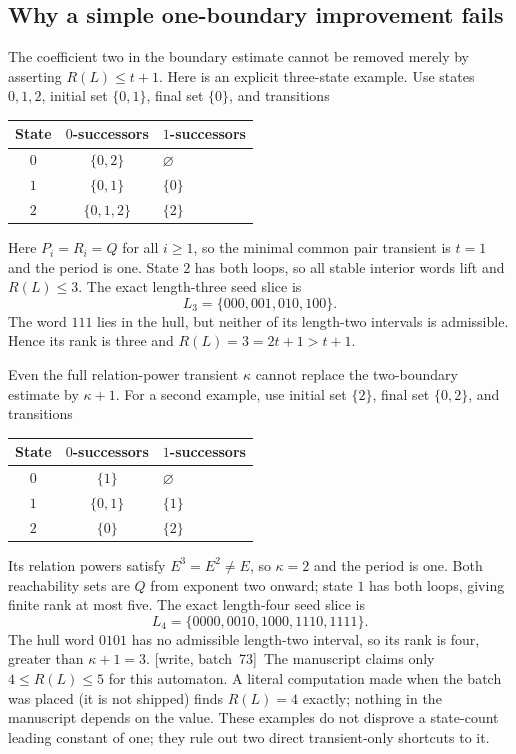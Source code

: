 \documentclass[11pt,letterpaper]{article}
\theoremstyle{definition}
\theoremstyle{remark}
\newcommand{\wsevthree}{\textup{[write, batch~73]}}
\begin{document}
\subsection{Why a simple one-boundary improvement fails}
The coefficient two in the boundary estimate cannot be removed merely by asserting $R(L)\le t+1$. Here is an explicit three-state example. Use states $0,1,2$, initial set $\{0,1\}$, final set $\{0\}$, and transitions
\begin{center}
\begin{tabular}{ccl}
\toprule
State & $0$-successors & $1$-successors\\
\midrule
$0$ & $\{0,2\}$ & $\varnothing$\\
$1$ & $\{0,1\}$ & $\{0\}$\\
$2$ & $\{0,1,2\}$ & $\{2\}$\\
\bottomrule
\end{tabular}
\end{center}
Here $P_i=R_i=Q$ for all $i\ge1$, so the minimal common pair transient is $t=1$ and the period is one. State $2$ has both loops, so all stable interior words lift and $R(L)\le3$. The exact length-three seed slice is
\[
L_3=\{000,001,010,100\}.
\]
The word $111$ lies in the hull, but neither of its length-two intervals is admissible. Hence its rank is three and $R(L)=3=2t+1>t+1$.

Even the full relation-power transient $\kappa$ cannot replace the two-boundary estimate by $\kappa+1$. For a second example, use initial set $\{2\}$, final set $\{0,2\}$, and transitions
\begin{center}
\begin{tabular}{ccl}
\toprule
State & $0$-successors & $1$-successors\\
\midrule
$0$ & $\{1\}$ & $\varnothing$\\
$1$ & $\{0,1\}$ & $\{1\}$\\
$2$ & $\{0\}$ & $\{2\}$\\
\bottomrule
\end{tabular}
\end{center}
Its relation powers satisfy $E^3=E^2\ne E$, so $\kappa=2$ and the period is one. Both reachability sets are $Q$ from exponent two onward; state $1$ has both loops, giving finite rank at most five. The exact length-four seed slice is
\[
L_4=\{0000,0010,1000,1110,1111\}.
\]
The hull word $0101$ has no admissible length-two interval, so its rank is four, greater than $\kappa+1=3$.
\wsevthree\ The manuscript claims only $4\le R(L)\le5$ for this automaton. A
literal computation made when the batch was placed (it is not shipped) finds
$R(L)=4$ exactly; nothing in the manuscript depends on the value. These examples do not disprove a state-count leading constant of one; they rule out two direct transient-only shortcuts to it.
\end{document}
